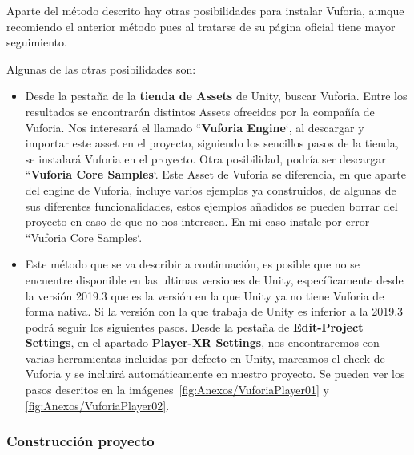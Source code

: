 Aparte del método descrito hay otras posibilidades para instalar Vuforia, aunque recomiendo el anterior método pues al tratarse de su página oficial tiene mayor seguimiento.

Algunas de las otras posibilidades son:
\begin{itemize}
	\item Desde la pestaña de la \textbf{tienda de Assets} de Unity, buscar Vuforia. Entre los resultados se encontrarán distintos Assets ofrecidos por la compañía de Vuforia. Nos interesará el llamado ``\textbf{Vuforia Engine}`, al descargar y importar este asset en el proyecto, siguiendo los sencillos pasos de la tienda, se instalará Vuforia en el proyecto.
	Otra posibilidad, podría ser descargar ``\textbf{Vuforia Core Samples}`. Este Asset de Vuforia se diferencia, en que aparte del engine de Vuforia, incluye varios ejemplos ya construidos, de algunas de sus diferentes funcionalidades, estos ejemplos añadidos se pueden borrar del proyecto en caso de que no nos interesen. En mi caso instale por error ``Vuforia Core Samples`.
	
	\item Este método que se va describir a continuación, es posible que no se encuentre disponible en las ultimas versiones de Unity, específicamente desde la versión 2019.3 que es la versión en la que Unity ya no tiene Vuforia de forma nativa. Si la versión con la que trabaja de Unity es inferior a la 2019.3 podrá seguir los siguientes pasos. Desde la pestaña de \textbf{Edit-Project Settings}, en el apartado \textbf{Player-XR Settings}, nos encontraremos con varias herramientas incluidas por defecto en Unity, marcamos el check de Vuforia y se incluirá automáticamente en nuestro proyecto. Se pueden ver los pasos descritos en la imágenes~\ref{fig:Anexos/VuforiaPlayer01} y \ref{fig:Anexos/VuforiaPlayer02}.
	
\end{itemize}



\subsubsection{Construcción proyecto}

